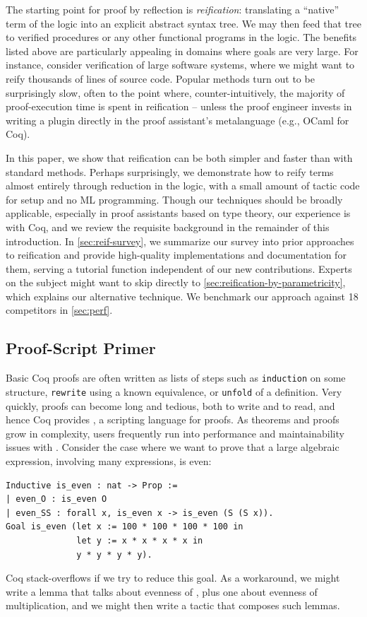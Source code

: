 The starting point for proof by reflection is \emph{reification}: translating a ``native'' term of the logic into an explicit abstract syntax tree.
We may then feed that tree to verified procedures or any other functional programs in the logic.
The benefits listed above are particularly appealing in domains where goals are very large.
For instance, consider verification of large software systems, where we might want to reify thousands of lines of source code.
Popular methods turn out to be surprisingly slow, often to the point where, counter-intuitively, the majority of proof-execution time is spent in reification -- unless the proof engineer invests in writing a plugin directly in the proof assistant's metalanguage (e.g., OCaml for Coq).

In this paper, we show that reification can be both simpler and faster than with standard methods.
Perhaps surprisingly, we demonstrate how to reify terms almost entirely through reduction in the logic, with a small amount of tactic code for setup and no ML programming.
Though our techniques should be broadly applicable, especially in proof assistants based on type theory, our experience is with Coq, and we review the requisite background in the remainder of this introduction.
In \autoref{sec:reif-survey}, we summarize our survey into prior approaches to reification and provide high-quality implementations and documentation for them, serving a tutorial function independent of our new contributions.
Experts on the subject might want to skip directly to \autoref{sec:reification-by-parametricity}, which explains our alternative technique.
We benchmark our approach against 18 competitors in \autoref{sec:perf}.

\subsection{Proof-Script Primer}
Basic Coq proofs are often written as lists of steps such as \texttt{induction} on some structure, \texttt{rewrite} using a known equivalence, or \texttt{unfold} of a definition.
Very quickly, proofs can become long and tedious, both to write and to read, and hence Coq provides \Ltac, a scripting language for proofs.
As theorems and proofs grow in complexity, users frequently run into performance and maintainability issues with \Ltac.
Consider the case where we want to prove that a large algebraic expression, involving many \space expressions, is even:
\begin{verbatim}
Inductive is_even : nat -> Prop :=
| even_O : is_even O
| even_SS : forall x, is_even x -> is_even (S (S x)).
Goal is_even (let x := 100 * 100 * 100 * 100 in
              let y := x * x * x * x in
              y * y * y * y).
\end{verbatim}
Coq stack-overflows if we try to reduce this goal.
As a workaround, we might write a lemma that talks about evenness of , plus one about evenness of multiplication, and we might then write a tactic that composes such lemmas.

